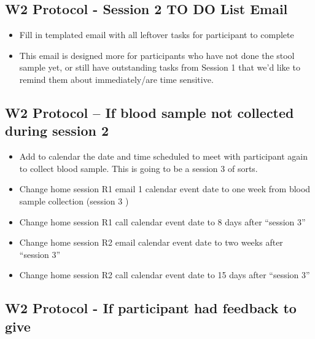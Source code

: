 \documentclass[]{book}
\begin{document}
\hypertarget{w2-protocol---session-2-to-do-list-email}{%
\subsection{W2 Protocol - Session 2 TO DO List Email}\label{w2-protocol---session-2-to-do-list-email}}

\begin{itemize}
\item
  Fill in templated email with all leftover tasks for participant to complete
\item
  This email is designed more for participants who have not done the stool sample yet, or still have outstanding tasks from Session 1 that we'd like to remind them about immediately/are time sensitive.
\end{itemize}

\hypertarget{w2-protocol-if-blood-sample-not-collected-during-session-2}{%
\subsection{W2 Protocol -- If blood sample not collected during session 2}\label{w2-protocol-if-blood-sample-not-collected-during-session-2}}

\begin{itemize}
\item
  Add to calendar the date and time scheduled to meet with participant again to collect blood sample. This is going to be a session 3 of sorts.
\item
  Change home session R1 email 1 calendar event date to one week from blood sample collection (session 3 )\\
\item
  Change home session R1 call calendar event date to 8 days after ``session 3''
\item
  Change home session R2 email calendar event date to two weeks after ``session 3''
\item
  Change home session R2 call calendar event date to 15 days after ``session 3''
\end{itemize}

\hypertarget{w2-protocol---if-participant-had-feedback-to-give}{%
\subsection{W2 Protocol - If participant had feedback to give}\label{w2-protocol---if-participant-had-feedback-to-give}}
\end{document}
